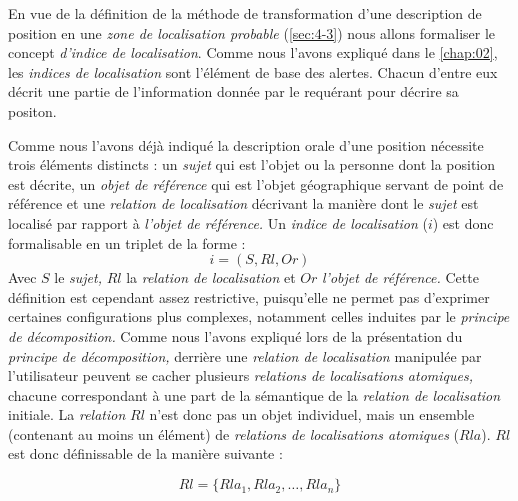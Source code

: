 En vue de la définition de la méthode de transformation d'une
description de position en une \emph{zone de localisation probable}
(\autoref{sec:4-3}) nous allons formaliser le concept \emph{d'indice
  de localisation}. Comme nous l'avons expliqué dans le
\autoref{chap:02}, les \emph{indices de localisation} sont l'élément
de base des alertes. Chacun d'entre eux décrit une partie de
l'information donnée par le requérant pour décrire sa positon.

Comme nous l'avons déjà indiqué la description orale d'une position
nécessite trois éléments distincts : un \emph{sujet} qui est l'objet
ou la personne dont la position est décrite, un \emph{objet de
  référence} qui est l'objet géographique servant de point de
référence et une \emph{relation de localisation} décrivant la manière
dont le \emph{sujet} est localisé par rapport à \emph{l'objet de
  référence.}  Un \emph{indice de localisation} (\(i\)) est donc
formalisable en un triplet de la forme :
%
\begin{equation}
  i = (S, Rl, Or)
\end{equation}
%
Avec \(S\) le \emph{sujet,} \(Rl\) la \emph{relation de localisation}
et \(Or\) \emph{l'objet de référence.} Cette définition est cependant
assez restrictive, puisqu'elle ne permet pas d'exprimer certaines
configurations plus complexes, notamment celles induites par le
\emph{principe de décomposition.} Comme nous l'avons expliqué lors de
la présentation du \emph{principe de décomposition,} derrière une
\emph{relation de localisation} manipulée par l'utilisateur peuvent se
cacher plusieurs \emph{relations de localisations atomiques,} chacune
correspondant à une part de la sémantique de la \emph{relation de
  localisation} initiale. La \emph{relation} \(Rl\) n'est donc pas un
objet individuel, mais un ensemble (contenant au moins un élément) de
\emph{relations de localisations atomiques} (\(Rla\)). \(Rl\) est donc
définissable de la manière suivante :

\begin{equation}
  Rl = \{Rla_1, Rla_2, \ldots, Rla_n\}
\end{equation}

